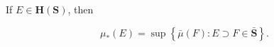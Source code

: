 If $E \in \mathbf{H}(\mathbf{S})$, then

$$\mu_*(E) = \sup \left\{ \bar{\mu}(F) : E \supset F \in \bar{\mathbf{S}} \right\}.$$
